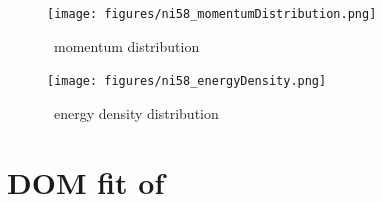 \begin{figure}[H]
    \centering
    \texttt{[image: figures/ni58\_momentumDistribution.png]}
    \caption{\niEight\ momentum distribution}
    \label{DOMFitData_ni58_momentumDistribution}
\end{figure}

\begin{figure}[H]
    \centering
    \texttt{[image: figures/ni58\_energyDensity.png]}
    \caption{\niEight\ energy density distribution}
    \label{DOMFitData_ni58_energyDensity}
\end{figure}

\section{DOM fit of \niFour}

